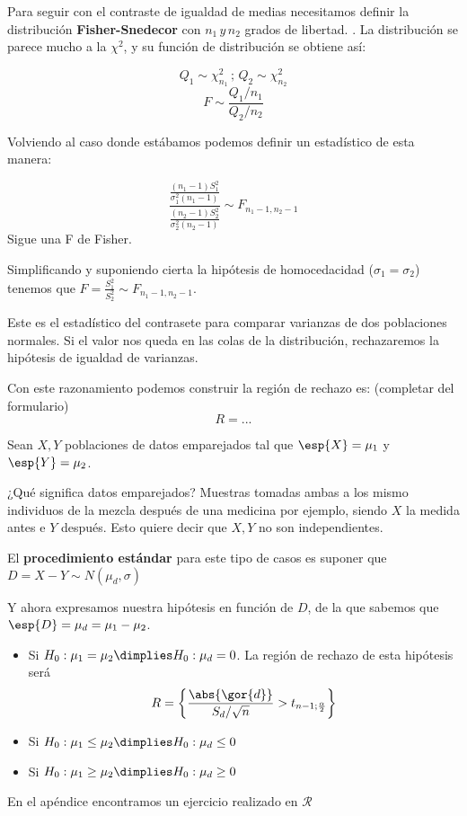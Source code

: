 \documentclass{apuntes}
\begin{document}
Para seguir con el contraste de igualdad de medias necesitamos definir la distribución \textbf{Fisher-Snedecor} con $n_1\,y\,n_2$ grados de libertad. . La distribución se parece mucho a la $\chi^2$, y su función de distribución se obtiene así:

\[Q_1 \sim \chi_{n_1}^2 \,;\, Q_2 \sim \chi_{n_2}^2\]
\[F \sim\displaystyle \frac{\displaystyle Q_1/n_1}{\displaystyle Q_2/n_2}\]

Volviendo al caso donde estábamos podemos definir un estadístico de esta manera:

\[\frac{\frac{(n_1-1)S_1^2}{\sigma_1^2(n_1-1)}}{\frac{(n_2-1)S_2^2}{\sigma_2^2 (n_2-1)}} \sim F_{n_1-1,n_2-1}\]
Sigue una F de Fisher.

Simplificando y suponiendo cierta la hipótesis de homocedacidad ($\sigma_1 = \sigma_2$) tenemos que $F = \displaystyle \frac{S_1^2}{S_2^2} \sim F_{n_1-1,n_2-1}$. 

Este es el estadístico del contrasete para comparar varianzas de dos poblaciones normales. Si el valor nos queda en las colas de la distribución, rechazaremos la hipótesis de igualdad de varianzas.

Con este razonamiento podemos construir la región de rechazo es: 
(completar del formulario)
\[R = ...\]

\begin{example}
Sean $X,Y$ poblaciones de datos emparejados  tal que $\esp{X} = \mu_1$ y $\esp{Y} = \mu_2$.


¿Qué significa datos emparejados? Muestras tomadas ambas a los mismo individuos de la mezcla después de una medicina por ejemplo, siendo $X$ la medida antes e $Y$ después. Esto quiere decir que $X,Y$ no son independientes.

El \textbf{procedimiento estándar} para este tipo de casos es suponer que $D =X-Y \sim N(\mu_d,\sigma)$

Y ahora expresamos nuestra hipótesis en función de $D$, de la que sabemos que $\esp{D} = \mu_d = \mu_1-\mu_2$.

\begin{itemize}
\item Si $H_0: \mu_1=\mu_2 \dimplies H_0: \mu_d=0 $. La región de rechazo de esta hipótesis será \[R = \left\{\frac{\abs{\gor{d}}}{S_d / \sqrt{n}} > t_{n-1;\frac{\alpha}{2}}\right\}\]
\item Si $H_0: \mu_1\leq\mu_2 \dimplies H_0: \mu_d\leq0 $
\item Si $H_0: \mu_1\geq\mu_2 \dimplies H_0: \mu_d\geq0 $
\end{itemize}
\end{example}
En el apéndice encontramos un ejercicio realizado en $\mathcal{R}$
\end{document}
